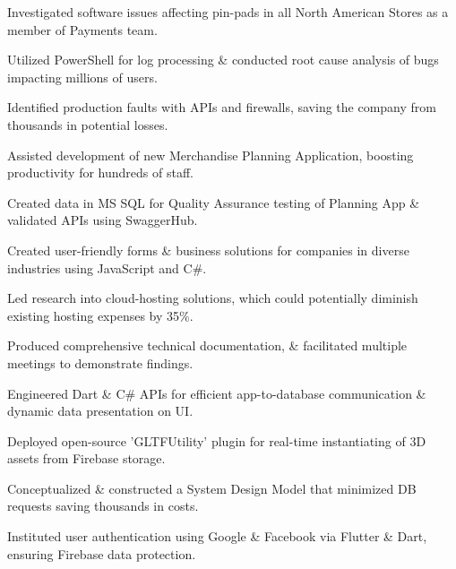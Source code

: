 \documentclass[]{deedy-resume-openfont}
\begin{document}
\begin{tightemize}
\item Investigated software issues affecting pin-pads in all North American Stores as a member of Payments team.
\item Utilized PowerShell for log processing \& conducted root cause analysis of bugs impacting millions of users.
\item Identified production faults with APIs and firewalls, saving the company from thousands in potential losses.
\item Assisted development of new Merchandise Planning Application, boosting productivity for hundreds of staff.
\item Created data in MS SQL for Quality Assurance testing of Planning App \& validated APIs using SwaggerHub.
\end{tightemize}
\sectionsep

\begin{tightemize}
\item Created user-friendly forms \& business solutions for companies in diverse industries using JavaScript and C\#.
\item Led research into cloud-hosting solutions, which could potentially diminish existing hosting expenses by 35\%.
\item Produced comprehensive technical documentation, \& facilitated multiple meetings to demonstrate findings.
\end{tightemize}




\descript{}
\begin{tightemize}
\item Engineered Dart \& C\# APIs for efficient app-to-database communication \& dynamic data presentation on UI.
\item Deployed open-source 'GLTFUtility' plugin for real-time instantiating of 3D assets from Firebase storage.
\item Conceptualized \& constructed a System Design Model that minimized DB requests saving thousands in costs.
\item Instituted user authentication using Google \& Facebook via Flutter \& Dart, ensuring Firebase data protection.
\end{tightemize}
\sectionsep
\end{document}
